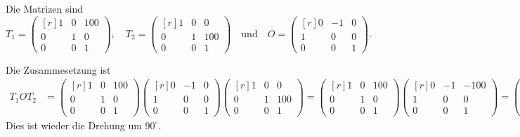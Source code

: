 \begin{loesung}
\begin{teilaufgaben}
\item
Die Matrizen sind
\[
T_1
=
\begin{pmatrix*}[r]
1 & 0 & 100 \\
0 & 1 &   0 \\
0 & 0 &   1
\end{pmatrix*},
\quad
T_2
=
\begin{pmatrix*}[r]
1 & 0 &   0 \\
0 & 1 & 100 \\
0 & 0 &   1
\end{pmatrix*}
\quad\text{und}\quad
O
=
\begin{pmatrix*}[r]
0 & -1 & 0 \\
1 &  0 & 0 \\
0 &  0 & 1
\end{pmatrix*}.
\]
\item
Die Zusammesetzung ist
\begin{align*}
T_1OT_2
&=
\begin{pmatrix*}[r]
1 & 0 & 100 \\
0 & 1 &   0 \\
0 & 0 &   1
\end{pmatrix*}
\begin{pmatrix*}[r]
0 & -1 & 0 \\
1 &  0 & 0 \\
0 &  0 & 1
\end{pmatrix*}
\begin{pmatrix*}[r]
1 & 0 &   0 \\
0 & 1 & 100 \\
0 & 0 &   1
\end{pmatrix*}
=
\begin{pmatrix*}[r]
1 & 0 & 100 \\
0 & 1 &   0 \\
0 & 0 &   1
\end{pmatrix*}
\begin{pmatrix*}[r]
0 & -1 & -100 \\
1 &  0 &    0 \\
0 &  0 &    1
\end{pmatrix*}
=
\begin{pmatrix*}[r]
0 & -1 & 0 \\
1 &  0 & 0 \\
0 &  0 & 1
\end{pmatrix*}.
\end{align*}
Dies ist wieder die Drehung um $90^\circ$.
\qedhere
\end{teilaufgaben}
\end{loesung}
